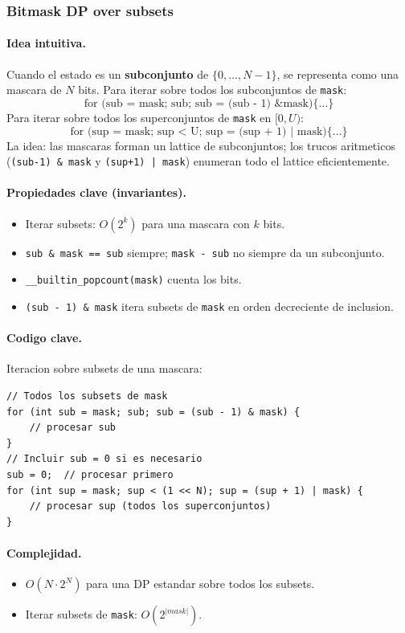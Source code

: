 ﻿\subsubsection{Bitmask DP over subsets}

\paragraph{Idea intuitiva.}
Cuando el estado es un \textbf{subconjunto} de $\{0, \dots, N-1\}$, se representa como una mascara de $N$ bits. Para iterar sobre todos los subconjuntos de \texttt{mask}:
\[ \text{for (sub = mask; sub; sub = (sub - 1) \& mask)} \{ \dots \} \]
Para iterar sobre todos los superconjuntos de \texttt{mask} en $[0, U)$:
\[ \text{for (sup = mask; sup < U; sup = (sup + 1) | mask)} \{ \dots \} \]
La idea: las mascaras forman un lattice de subconjuntos; los trucos aritmeticos (\texttt{(sub-1) \& mask} y \texttt{(sup+1) | mask}) enumeran todo el lattice eficientemente.

\paragraph{Propiedades clave (invariantes).}
\begin{itemize}\setlength\itemsep{0pt}
	\item Iterar subsets: $O(2^k)$ para una mascara con $k$ bits.
	\item \texttt{sub \& mask == sub} siempre; \texttt{mask - sub} no siempre da un subconjunto.
	\item \texttt{\_\_builtin\_popcount(mask)} cuenta los bits.
	\item \texttt{(sub - 1) \& mask} itera subsets de \texttt{mask} en orden decreciente de inclusion.
\end{itemize}

\paragraph{Codigo clave.}
Iteracion sobre subsets de una mascara:
\begin{verbatim}
// Todos los subsets de mask
for (int sub = mask; sub; sub = (sub - 1) & mask) {
    // procesar sub
}
// Incluir sub = 0 si es necesario
sub = 0;  // procesar primero
for (int sup = mask; sup < (1 << N); sup = (sup + 1) | mask) {
    // procesar sup (todos los superconjuntos)
}
\end{verbatim}

\paragraph{Complejidad.}
\begin{itemize}\setlength\itemsep{0pt}
	\item $O(N \cdot 2^N)$ para una DP estandar sobre todos los subsets.
	\item Iterar subsets de \texttt{mask}: $O(2^{|mask|})$.
\end{itemize}

